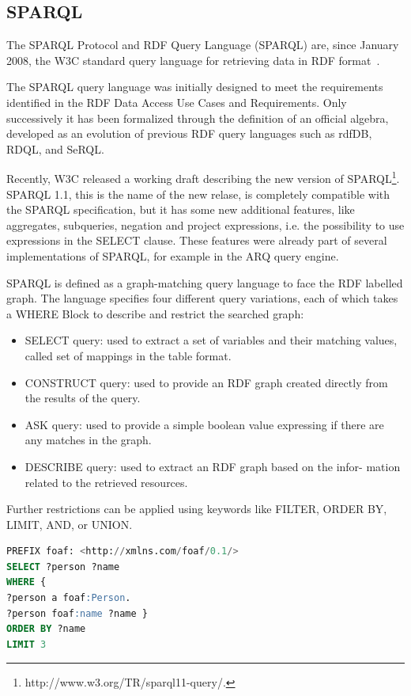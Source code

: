 \subsection{SPARQL}\label{sec:sparql}

The SPARQL Protocol and RDF Query Language (SPARQL) are, since January 2008, the W3C standard query language for retrieving data in RDF format~\cite{prudhommeaux_sparql_2008}.

The SPARQL query language was initially designed to meet the requirements identified in the RDF Data Access Use Cases and Requirements. Only successively it has been formalized through the definition of an official algebra, developed as an evolution of previous RDF query languages such as rdfDB, RDQL, and SeRQL.

Recently, W3C released a working draft describing the new version of SPARQL\footnote{http://www.w3.org/TR/sparql11-query/.}. SPARQL 1.1, this is the name of the new relase, is completely compatible with the SPARQL specification, but it has some new additional features, like aggregates, subqueries, negation and project expressions, i.e. the possibility to use expressions in the SELECT clause. These features were already part of several implementations of SPARQL, for example in the ARQ query engine. 

SPARQL is defined as a graph-matching query language to face the RDF labelled graph. The language specifies four different query variations, each of which takes a WHERE Block to describe and restrict the searched graph:
\begin{itemize}
\item SELECT query: used to extract a set of variables and their matching values, called set of mappings in the table format.
\item CONSTRUCT query: used to provide an RDF graph created directly from the results of the query.
\item ASK query: used to provide a simple boolean value expressing if there are any matches in the graph.
\item DESCRIBE query: used to extract an RDF graph based on the infor- mation related to the retrieved resources.
\end{itemize}

Further restrictions can be applied using keywords like FILTER, ORDER BY, LIMIT, AND, or UNION.

\begin{lstlisting}[language=SQL, caption=An example of a simple SPARQL query , keywords={PREFIX,SELECT,WHERE,ORDER,BY, LIMIT }, label=code:sparql]
PREFIX foaf: <http://xmlns.com/foaf/0.1/> 
SELECT ?person ?name
WHERE {
?person a foaf:Person.
?person foaf:name ?name }
ORDER BY ?name 
LIMIT 3
\end{lstlisting}

